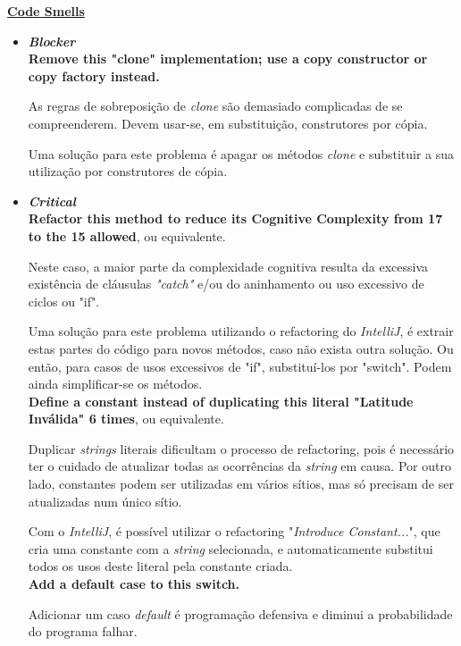 \documentclass[a4paper]{report}
\begin{document}
\underline{\textbf{Code Smells}}
\begin{itemize}
    \item \textit{\textbf{Blocker}}\\
    \textbf{Remove this "clone" implementation; use a copy constructor or copy factory instead.}
    
    As regras de sobreposição de \textit{clone} são demasiado complicadas de se compreenderem. Devem usar-se, em substituição, construtores por cópia. 
    
    Uma solução para este problema é apagar os métodos \textit{clone} e substituir a sua utilização por construtores de cópia. \\
    
    \item \textit{\textbf{Critical}}\\
    \textbf{Refactor this method to reduce its Cognitive Complexity from 17 to the 15 allowed}, ou equivalente.
    
    Neste caso, a maior parte da complexidade cognitiva resulta da excessiva existência de cláusulas \textit{"catch"} e/ou do aninhamento ou uso excessivo de ciclos ou "if".
    
    Uma solução para este problema utilizando o refactoring do \textit{IntelliJ}, é extrair estas partes do código para novos métodos, caso não exista outra solução.
    Ou então, para casos de usos excessivos de "if", substituí-los por "switch". Podem ainda simplificar-se os métodos. \\
    
    
    \textbf{Define a constant instead of duplicating this literal "Latitude Inválida" 6 times}, ou equivalente.

    Duplicar \textit{strings} literais dificultam o processo de refactoring, pois é necessário ter o cuidado de atualizar todas as ocorrências da \textit{string} em causa.
    Por outro lado, constantes podem ser utilizadas em vários sítios, mas só precisam de ser atualizadas num único sítio.

    Com o \textit{IntelliJ}, é possível utilizar o refactoring "\textit{Introduce Constant...}", que cria uma constante com a \textit{string} selecionada, e automaticamente substitui todos os usos deste literal pela constante criada.\\

    \textbf{Add a default case to this switch.}

    Adicionar um caso \textit{default} é programação defensiva e diminui a probabilidade do programa falhar.


\end{itemize}
\end{document}
